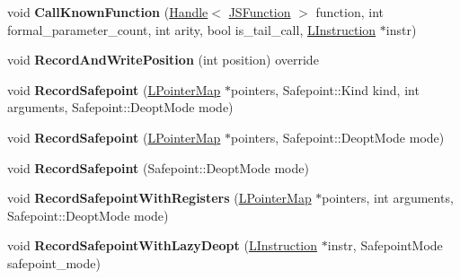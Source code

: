 \begin{DoxyCompactItemize}
\item 
void {\bfseries Call\+Known\+Function} (\hyperlink{classv8_1_1internal_1_1_handle}{Handle}$<$ \hyperlink{classv8_1_1internal_1_1_j_s_function}{J\+S\+Function} $>$ function, int formal\+\_\+parameter\+\_\+count, int arity, bool is\+\_\+tail\+\_\+call, \hyperlink{classv8_1_1internal_1_1_l_instruction}{L\+Instruction} $\ast$instr)\hypertarget{classv8_1_1internal_1_1_l_code_gen_adec87ca608c3363d2fa40b37952378b9}{}\label{classv8_1_1internal_1_1_l_code_gen_adec87ca608c3363d2fa40b37952378b9}

\item 
void {\bfseries Record\+And\+Write\+Position} (int position) override\hypertarget{classv8_1_1internal_1_1_l_code_gen_a7f2c2fb5fe21ed4f96fa43839a3c459d}{}\label{classv8_1_1internal_1_1_l_code_gen_a7f2c2fb5fe21ed4f96fa43839a3c459d}

\item 
void {\bfseries Record\+Safepoint} (\hyperlink{classv8_1_1internal_1_1_l_pointer_map}{L\+Pointer\+Map} $\ast$pointers, Safepoint\+::\+Kind kind, int arguments, Safepoint\+::\+Deopt\+Mode mode)\hypertarget{classv8_1_1internal_1_1_l_code_gen_a5c5e6c0360111f74e6c274c456c70b74}{}\label{classv8_1_1internal_1_1_l_code_gen_a5c5e6c0360111f74e6c274c456c70b74}

\item 
void {\bfseries Record\+Safepoint} (\hyperlink{classv8_1_1internal_1_1_l_pointer_map}{L\+Pointer\+Map} $\ast$pointers, Safepoint\+::\+Deopt\+Mode mode)\hypertarget{classv8_1_1internal_1_1_l_code_gen_a7f742e0bc068c384673a3490e15b230c}{}\label{classv8_1_1internal_1_1_l_code_gen_a7f742e0bc068c384673a3490e15b230c}

\item 
void {\bfseries Record\+Safepoint} (Safepoint\+::\+Deopt\+Mode mode)\hypertarget{classv8_1_1internal_1_1_l_code_gen_a3621dccea782082b57057f617a9dd24a}{}\label{classv8_1_1internal_1_1_l_code_gen_a3621dccea782082b57057f617a9dd24a}

\item 
void {\bfseries Record\+Safepoint\+With\+Registers} (\hyperlink{classv8_1_1internal_1_1_l_pointer_map}{L\+Pointer\+Map} $\ast$pointers, int arguments, Safepoint\+::\+Deopt\+Mode mode)\hypertarget{classv8_1_1internal_1_1_l_code_gen_a15c074803ff1d0270234efb3e8830c75}{}\label{classv8_1_1internal_1_1_l_code_gen_a15c074803ff1d0270234efb3e8830c75}

\item 
void {\bfseries Record\+Safepoint\+With\+Lazy\+Deopt} (\hyperlink{classv8_1_1internal_1_1_l_instruction}{L\+Instruction} $\ast$instr, Safepoint\+Mode safepoint\+\_\+mode)\hypertarget{classv8_1_1internal_1_1_l_code_gen_ae96e1ea2617dfdd8a23b554d85bdd250}{}\label{classv8_1_1internal_1_1_l_code_gen_ae96e1ea2617dfdd8a23b554d85bdd250}


\end{DoxyCompactItemize}
